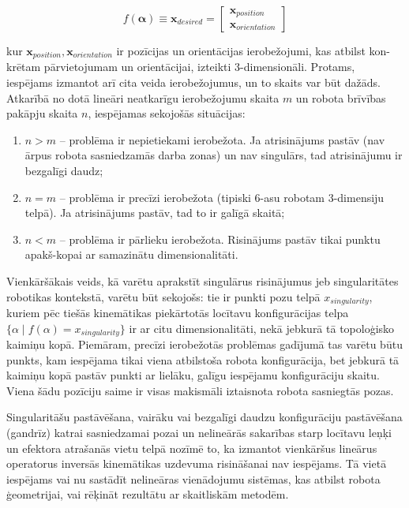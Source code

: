 \documentclass[12pt, a4paper]{article}
\numberwithin{equation}{section} %
\begin{document}
\begin{equation}
    f(\boldsymbol{\alpha}) \equiv \boldsymbol{x}_{desired} = 
    \begin{bmatrix}
        \boldsymbol{x}_{position} \\
        \boldsymbol{x}_{orientation} 
    \end{bmatrix}
\end{equation}

kur $\boldsymbol{x}_{position}, \boldsymbol{x}_{orientation}$ ir pozīcijas un orientācijas ierobežojumi, kas atbilst kon-krētam pārvietojumam un orientācijai, izteikti 3-dimensionāli. Protams, iespējams izmantot arī cita veida ierobežojumus, un to skaits var būt dažāds. Atkarībā no dotā lineāri neatkarīgu ierobežojumu skaita $m$ un robota brīvības pakāpju skaita $n$, iespējamas sekojošās situācijas:

\begin{enumerate}
    \item $n > m$ -- problēma ir nepietiekami ierobežota. Ja atrisinājums pastāv (nav ārpus robota sasniedzamās darba zonas) un nav singulārs, tad atrisinājumu ir bezgalīgi daudz;
    \item $n = m$ -- problēma ir precīzi ierobežota  (tipiski 6-asu robotam 3-dimensiju telpā). Ja atrisinājums pastāv, tad to ir galīgā skaitā;
    \item $n < m$ -- problēma ir pārlieku ierobežota. Risinājums pastāv tikai punktu apakš-kopai ar samazinātu dimensionalitāti.
\end{enumerate}

Vienkāršākais veids, kā varētu aprakstīt singulārus risinājumus jeb singularitātes robotikas kontekstā, varētu būt sekojošs: tie ir punkti pozu telpā $x_{singularity}$, kuriem pēc tiešās kinemātikas piekārtotās locītavu konfigurācijas telpa $\lbrace \alpha \mid f(\alpha) = x_{singularity} \rbrace$ ir ar citu dimensionalitāti, nekā jebkurā tā topoloģisko kaimiņu kopā. Piemāram, precīzi ierobežotās problēmas gadījumā tas varētu būtu punkts, kam iespējama tikai viena atbilstoša robota konfigurācija, bet jebkurā tā kaimiņu kopā pastāv punkti ar lielāku, galīgu iespējamu konfigurāciju skaitu. Viena šādu pozīciju saime ir visas makismāli iztaisnota robota sasniegtās pozas.

Singularitāšu pastāvēšana, vairāku vai bezgalīgi daudzu konfigurāciju pastāvēšana (gandrīz) katrai sasniedzamai pozai un nelineārās sakarības starp locītavu leņķi un efektora atrašanās vietu telpā nozīmē to, ka izmantot vienkāršus lineārus operatorus inversās kinemātikas uzdevuma risināšanai nav iespējams. Tā vietā iespējams vai nu sastādīt nelineāras vienādojumu sistēmas, kas atbilst robota ģeometrijai, vai rēķināt rezultātu ar skaitliskām metodēm. 
\end{document}
